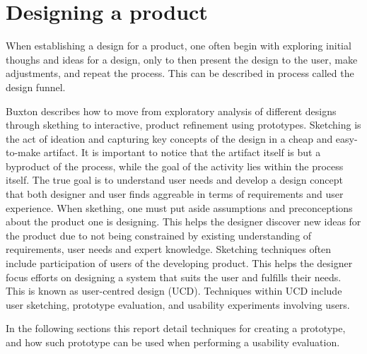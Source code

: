 \section{Designing a product} %
When establishing a design for a product, one often begin with exploring initial thoughs and ideas for a design, only to then present the design to the user, make adjustments, and repeat the process. 
This can be described in process called the design funnel.\cite{BUXTON2007135_skething}

Buxton describes how to move from exploratory analysis of different designs through skething to interactive, product refinement using prototypes.   
Sketching is the act of ideation and capturing key concepts of the design in a cheap and easy-to-make artifact. 
It is important to notice that the artifact itself is but a byproduct of the process, while the goal of the activity lies within the process itself.\cite{BUXTON2007135_skething}
The true goal is to understand user needs and develop a design concept that both designer and user finds aggreable in terms of requirements and user experience. 
When skething, one must put aside  assumptions and preconceptions about the product one is designing.
This helps the designer discover new ideas for the product due to not being constrained by existing  understanding of requirements, user needs and expert knowledge. %
Sketching techniques often include participation of users of the developing product.
This helps the designer focus efforts on designing a system that suits the user and fulfills their needs.
This is known as user-centred design (UCD). \cite{user-centred-design}
Techniques within UCD include user sketching, prototype evaluation, and usability experiments involving users.

In the following sections this report detail techniques for creating a prototype, and how such prototype can be used when performing a usability evaluation.